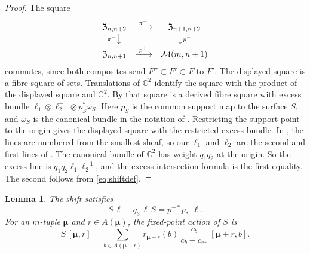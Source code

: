 \documentclass[11pt]{amsart}
\newtheorem{lemma}[theorem]{Lemma}
\theoremstyle{definition}
\theoremstyle{remark}
\newcommand{\bmu}{{\boldsymbol{\mu}}}
\newcommand{\Add}[1]{A(#1)}                      %
\newcommand{\res}[2]{r_{#1}(#2)}                 %
\newcommand{\ceig}[1]{c_{#1}}                    %
\newcommand{\bplus}[1]{{#1}^{+}}                 %
\newcommand{\Gies}[2]{\mathcal M(#1,#2)}         %
\newcommand{\Zc}{\mathfrak Z}
\newcommand{\Hecke}[1]{\Zc_{#1,#1+1}}            %
\newcommand{\HeckeTwo}[1]{\Zc_{#1,#1+2}}         %
\newcommand{\Sh}{F}                              %
\newcommand{\pt}[2]{[#1,#2]}                     %
\newcommand{\pminus}{p^-}                        %
\newcommand{\pplus}{p^+}                         %
\newcommand{\taut}{\ell}                         %
\newcommand{\tautone}{\ell_1}
\newcommand{\tauttwo}{\ell_2}
\newcommand{\pulm}{p^{-*}}                       %
\newcommand{\pushp}{p^+_*}                       %
\newcommand{\pim}{\pi^-}                         %
\newcommand{\pip}{\pi^+}                         %
\newcommand{\Shift}{S}                           %
\begin{document}
\begin{proof}
The square
\[
 \begin{array}{ccc}
 \HeckeTwo{n}&\xrightarrow{\;\pip\;}&\Zc_{n+1,n+2}\\[2pt]
 {\scriptstyle\pim}\big\downarrow&&\big\downarrow{\scriptstyle\pminus}\\[2pt]
 \Hecke{n}&\xrightarrow{\;\pplus\;}&\Gies{m}{n+1}
 \end{array}
\]
commutes, since both composites send \(\Sh''\subset\Sh'\subset\Sh\) to \(\Sh'\).
The displayed square is a fibre square of sets. Translations of \(\mathbb C^2\) identify the square
\cite[(2.37)]{N2} with the product of the displayed square and \(\mathbb C^2\). By
\cite[Proposition~2.27]{N2} that square is a derived fibre square with excess
bundle \(\tautone\otimes\tauttwo^{-1}\otimes p_S^*\omega_S\).
Here \(p_S\) is the common support map to the surface \(S\), and \(\omega_S\)
is the canonical bundle in the notation of \cite{N2}.
Restricting the support point to the origin gives the displayed square with the restricted
excess bundle. In \cite{N2}, the lines are numbered from the smallest sheaf, so our
\(\tautone\) and \(\tauttwo\) are the second and first lines of \cite{N2}. The canonical bundle of \(\mathbb C^2\) has weight
\(q_1q_2\) at the origin. So the excess line is \(q_1q_2\tautone\tauttwo^{-1}\),
and the excess intersection formula \cite[Proposition~3.4]{N2} is the first
equality. The second follows from \eqref{eq:shiftdef}.
\end{proof}


\begin{lemma}\label{lem:shiftfixed}
The shift satisfies
\begin{equation}\label{eq:displacement}
 \Shift\,\taut-q_3\,\taut\,\Shift=\pulm\pushp\,\taut.
\end{equation}
For an \(m\)-tuple \(\bmu\) and \(r\in\Add{\bmu}\), the fixed-point action of \(\Shift\) is
\[
 \Shift\,\pt{\bmu}{r}
 =\sum_{b\in\Add{\bmu+r}}
   \res{\bmu+r}{b}\,\frac{\ceig{b}}{\ceig{b}-\ceig{\bplus{r}}}\,
   \pt{\bmu+r}{b}.
\]
\end{lemma}
\end{document}
